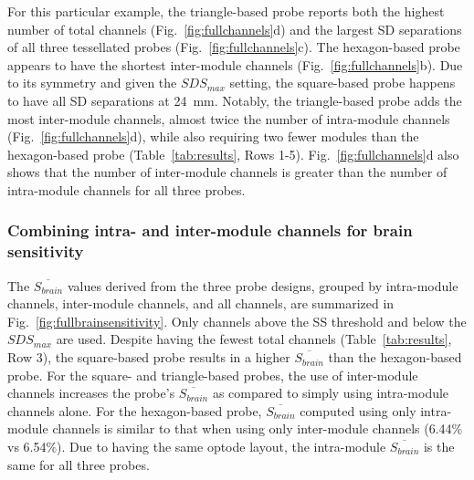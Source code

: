 \begin{figure}
\end{figure} 

For this particular example, the triangle-based probe reports both the highest number of total channels (Fig.~\ref{fig:fullchannels}d) and the largest \ac{SD} separations of all three tessellated probes (Fig.~\ref{fig:fullchannels}c). The hexagon-based probe appears to have the shortest inter-module channels (Fig.~\ref{fig:fullchannels}b). Due to its symmetry and given the $SDS_{max}$ setting, the square-based probe happens to have all \ac{SD} separations at 24~mm. Notably, the triangle-based probe adds the most inter-module channels, almost twice the number of intra-module channels (Fig.~\ref{fig:fullchannels}d), while also requiring two fewer modules than the hexagon-based probe (Table~\ref{tab:results}, Rows 1-5). Fig.~\ref{fig:fullchannels}d also shows that the number of inter-module channels is greater than the number of intra-module channels for all three probes.


\subsubsection{Combining intra- and inter-module channels for brain sensitivity}
The $\overline{S_{brain}}$ values derived from the three probe designs, grouped by intra-module channels, inter-module channels, and all channels, are summarized in Fig.~\ref{fig:fullbrainsensitivity}. Only channels above the SS threshold and below the $SDS_{max}$ are used. Despite having the fewest total channels (Table~\ref{tab:results}, Row 3), the square-based probe results in a higher $\overline{S_{brain}}$ than the hexagon-based probe. For the square- and triangle-based probes, the use of inter-module channels increases the probe's $\overline{S_{brain}}$ as compared to simply using intra-module channels alone. For the hexagon-based probe, $\overline{S_{brain}}$ computed using only intra-module channels is similar to that when using only inter-module channels (6.44\% vs 6.54\%). Due to having the same optode layout, the intra-module $\overline{S_{brain}}$ is the same for all three probes. 

